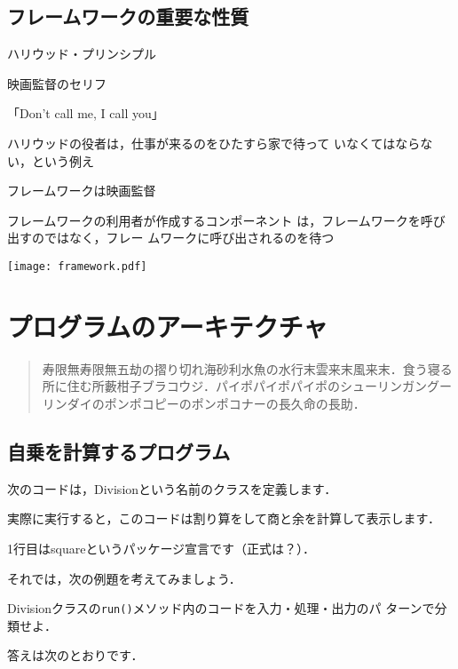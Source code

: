 \documentclass[a4j,papersize]{jsbook}
\begin{document}
\section{フレームワークの重要な性質}
ハリウッド・プリンシプル 

映画監督のセリフ 

「Don’t call me, I call you」 

 ハリウッドの役者は，仕事が来るのをひたすら家で待って
いなくてはならない，という例え 

フレームワークは映画監督 

フレームワークの利用者が作成するコンポーネント
は，フレームワークを呼び出すのではなく，フレー
ムワークに呼び出されるのを待つ 


\texttt{[image: framework.pdf]}


\chapter{プログラムのアーキテクチャ}

\begin{abstract}
寿限無寿限無五劫の摺り切れ海砂利水魚の水行末雲来末風来末．食う寝る所に住む所藪柑子ブラコウジ．パイポパイポパイポのシューリンガングーリンダイのポンポコピーのポンポコナーの長久命の長助．
\end{abstract}

\section{自乗を計算するプログラム}

次のコードは，Divisionという名前のクラスを定義します．

実際に実行すると，このコードは割り算をして商と余を計算して表示します．



1行目はsquareというパッケージ宣言です（正式は？）．

それでは，次の例題を考えてみましょう．

\begin{例題}
 Divisionクラスの\texttt{run()}メソッド内のコードを入力・処理・出力のパ
 ターンで分類せよ．
\end{例題}

答えは次のとおりです．
\end{document}
